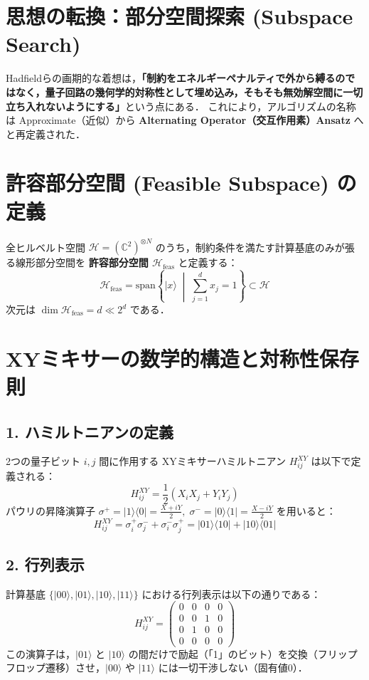 \documentclass[11pt,a4paper,oneside,openany]{ltjsbook}
\theoremstyle{definition}
\theoremstyle{plain}
\theoremstyle{remark}
\newcommand{\ket}[1]{|#1\rangle}
\newcommand{\bra}[1]{\langle#1|}
\begin{document}
\section{思想の転換：部分空間探索 (Subspace Search)}
Hadfieldらの画期的な着想は，\textbf{「制約をエネルギーペナルティで外から縛るのではなく，量子回路の幾何学的対称性として埋め込み，そもそも無効解空間に一切立ち入れないようにする」}という点にある．
これにより，アルゴリズムの名称は Approximate（近似）から \textbf{Alternating Operator（交互作用素）Ansatz} へと再定義された．

\section{許容部分空間 (Feasible Subspace) の定義}
全ヒルベルト空間 $\mathcal{H} = (\mathbb{C}^2)^{\otimes N}$ のうち，制約条件を満たす計算基底のみが張る線形部分空間を \textbf{許容部分空間 $\mathcal{H}_{\text{feas}}$} と定義する：
\begin{equation}
    \mathcal{H}_{\text{feas}} = \text{span}\left\{ \ket{x} \;\middle|\; \sum_{j=1}^d x_j = 1 \right\} \subset \mathcal{H}
\end{equation}
次元は $\dim \mathcal{H}_{\text{feas}} = d \ll 2^d$ である．

\section{XYミキサーの数学的構造と対称性保存則}

\subsection{1. ハミルトニアンの定義}
2つの量子ビット $i, j$ 間に作用する XYミキサーハミルトニアン $H_{ij}^{XY}$ は以下で定義される：
\begin{equation}
    H_{ij}^{XY} = \frac{1}{2}\left( X_i X_j + Y_i Y_j \right)
\end{equation}
パウリの昇降演算子 $\sigma^+ = \ket{1}\bra{0} = \frac{X + iY}{2}, \; \sigma^- = \ket{0}\bra{1} = \frac{X - iY}{2}$ を用いると：
\begin{equation}
    H_{ij}^{XY} = \sigma_i^+ \sigma_j^- + \sigma_i^- \sigma_j^+ = \ket{01}\bra{10} + \ket{10}\bra{01}
\end{equation}

\subsection{2. 行列表示}
計算基底 $\{\ket{00}, \ket{01}, \ket{10}, \ket{11}\}$ における行列表示は以下の通りである：
\begin{equation}
    H_{ij}^{XY} = \begin{pmatrix}
        0 & 0 & 0 & 0 \\
        0 & 0 & 1 & 0 \\
        0 & 1 & 0 & 0 \\
        0 & 0 & 0 & 0
    \end{pmatrix}
\end{equation}
この演算子は，$\ket{01}$ と $\ket{10}$ の間だけで励起（「1」のビット）を交換（フリップフロップ遷移）させ，$\ket{00}$ や $\ket{11}$ には一切干渉しない（固有値0）．
\end{document}
